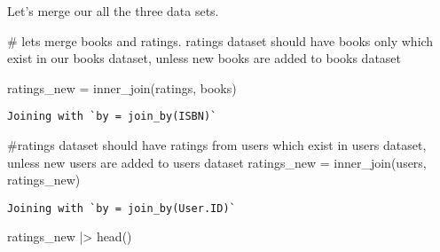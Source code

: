 \documentclass[
]{report}
\newenvironment{Shaded}{\begin{snugshade}}{\end{snugshade}}
\newcommand{\CommentTok}[1]{\textcolor[rgb]{0.37,0.37,0.37}{#1}}
\newcommand{\FunctionTok}[1]{\textcolor[rgb]{0.28,0.35,0.67}{#1}}
\newcommand{\NormalTok}[1]{\textcolor[rgb]{0.00,0.23,0.31}{#1}}
\newcommand{\OtherTok}[1]{\textcolor[rgb]{0.00,0.23,0.31}{#1}}
\newcommand{\SpecialCharTok}[1]{\textcolor[rgb]{0.37,0.37,0.37}{#1}}
\begin{document}
Let's merge our all the three data sets.

\begin{Shaded}
\begin{Highlighting}[]
\CommentTok{\# let\textquotesingle{}s merge books and ratings. ratings dataset should have books only which exist in our books dataset, unless new books are added to books dataset}

\NormalTok{ratings\_new }\OtherTok{=} \FunctionTok{inner\_join}\NormalTok{(ratings, books)}
\end{Highlighting}
\end{Shaded}

\begin{verbatim}
Joining with `by = join_by(ISBN)`
\end{verbatim}

\begin{Shaded}
\begin{Highlighting}[]
\CommentTok{\#ratings dataset should have ratings from users which exist in users dataset, unless new users are added to users dataset}
\NormalTok{ratings\_new }\OtherTok{=} \FunctionTok{inner\_join}\NormalTok{(users, ratings\_new)}
\end{Highlighting}
\end{Shaded}

\begin{verbatim}
Joining with `by = join_by(User.ID)`
\end{verbatim}

\begin{Shaded}
\begin{Highlighting}[]
\NormalTok{ratings\_new }\SpecialCharTok{|\textgreater{}} \FunctionTok{head}\NormalTok{()}
\end{Highlighting}
\end{Shaded}
\end{document}
